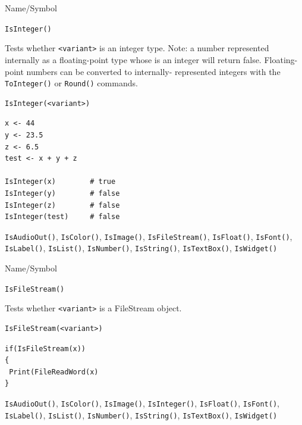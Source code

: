 \begin{desc}{Name/Symbol}
\item[Name/Symbol]	\verb+IsInteger()+

\item[Description] Tests whether \verb+<variant>+ is an integer type.
  Note: a number represented internally as a floating-point type whose
  is an integer will return false.  Floating-point numbers can be
  converted to internally- represented integers with the
  \verb+ToInteger()+ or \verb+Round()+ commands.
 
\item[Usage]		
\begin{verbatim}
IsInteger(<variant>)
\end{verbatim}

\item[Example]
\begin{verbatim}
x <- 44
y <- 23.5
z <- 6.5
test <- x + y + z 
	
IsInteger(x)		# true
IsInteger(y)		# false
IsInteger(z)		# false
IsInteger(test)		# false
\end{verbatim}

\item[See Also] \verb+IsAudioOut()+, \verb+IsColor()+,
  \verb+IsImage()+, \verb+IsFileStream()+, \verb+IsFloat()+,
  \verb+IsFont()+, \verb+IsLabel()+, \verb+IsList()+,
  \verb+IsNumber()+, \verb+IsString()+, \verb+IsTextBox()+,
  \verb+IsWidget()+
\end{desc}



\begin{desc}{Name/Symbol}
\item[Name/Symbol]	\verb+IsFileStream()+

\item[Description]	Tests whether \verb+<variant>+ is a FileStream object.

\item[Usage]		
\begin{verbatim}
IsFileStream(<variant>)
\end{verbatim}

\item[Example]
\begin{verbatim}
if(IsFileStream(x))
{
 Print(FileReadWord(x)
}
\end{verbatim}

\item[See Also] \verb+IsAudioOut()+, \verb+IsColor()+,
  \verb+IsImage()+, \verb+IsInteger()+, \verb+IsFloat()+,
  \verb+IsFont()+, \verb+IsLabel()+, \verb+IsList()+,
  \verb+IsNumber()+, \verb+IsString()+, \verb+IsTextBox()+,
  \verb+IsWidget()+
\end{desc}



